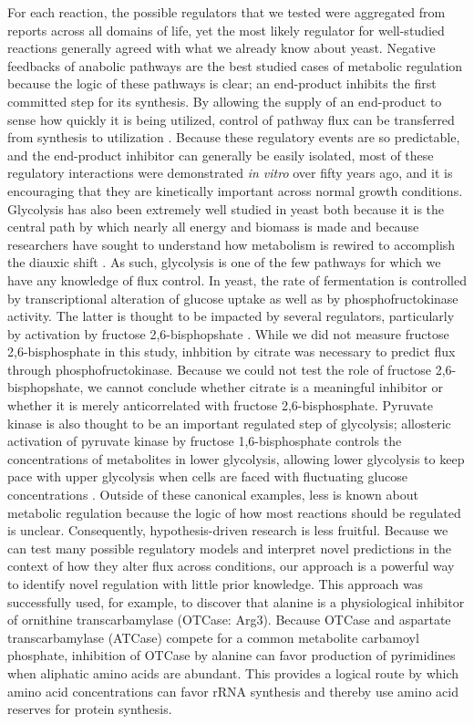 For each reaction, the possible regulators that we tested were aggregated from reports across all domains of life, yet the most likely regulator for well-studied reactions generally agreed with what we already know about yeast.  Negative feedbacks of anabolic pathways are the best studied cases of metabolic regulation because the logic of these pathways is clear; an end-product inhibits the first committed step for its synthesis.  By allowing the supply of an end-product to sense how quickly it is being utilized, control of pathway flux can be transferred from synthesis to utilization \cite{CornishBowden:1995fy}. Because these regulatory events are so predictable, and the end-product inhibitor can generally be easily isolated, most of these regulatory interactions were demonstrated \textit{in vitro} over fifty years ago, and it is encouraging that they are kinetically important across normal growth conditions.  Glycolysis has also been extremely well studied in yeast both because it is the central path by which nearly all energy and biomass is made and because researchers have sought to understand how metabolism is rewired to accomplish the diauxic shift \cite{Zampar:2013fr}. As such, glycolysis is one of the few pathways for which we have any knowledge of flux control.  In yeast, the rate of fermentation is controlled by transcriptional alteration of glucose uptake as well as by phosphofructokinase activity.  The latter is thought to be impacted by several regulators, particularly by activation by fructose 2,6-bisphopshate \cite{Cortassa:1994is, vanEunen:2012cr}. While we did not measure fructose 2,6-bisphosphate in this study, inhbition by citrate was necessary to predict flux through phosphofructokinase. Because we could not test the role of fructose 2,6-bisphopshate, we cannot conclude whether citrate is a meaningful inhibitor or whether it is merely anticorrelated with fructose 2,6-bisphosphate. Pyruvate kinase is also thought to be an important regulated step of glycolysis; allosteric activation of pyruvate kinase by fructose 1,6-bisphosphate controls the concentrations of metabolites in lower glycolysis, allowing lower glycolysis to keep pace with upper glycolysis when cells are faced with fluctuating glucose concentrations \cite{Xu:2012gg}. Outside of these canonical examples, less is known about metabolic regulation because the logic of how most reactions should be regulated is unclear. Consequently, hypothesis-driven research is less fruitful. Because we can test many possible regulatory models and interpret novel predictions in the context of how they alter flux across conditions, our approach is a powerful way to identify novel regulation with little prior knowledge.  This approach was successfully used, for example, to discover that alanine is a physiological inhibitor of ornithine transcarbamylase (OTCase: Arg3).  Because OTCase and aspartate transcarbamylase (ATCase) compete for a common metabolite carbamoyl phosphate, inhibition of OTCase by alanine can favor production of pyrimidines when aliphatic amino acids are abundant.  This provides a logical route by which amino acid concentrations can favor rRNA synthesis and thereby use amino acid reserves for protein synthesis.  

